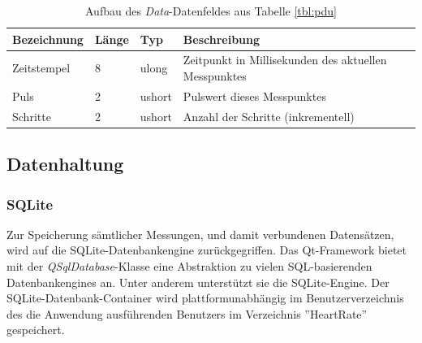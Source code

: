 \begin{table}[h]
	\centering
		\begin{tabularx}{\textwidth}{l|l|l|X}
			\hline
			Bezeichnung & Länge & Typ & Beschreibung \\
			\hline
			\hline
			Zeitstempel & 8 & ulong & Zeitpunkt in Millisekunden des aktuellen Messpunktes\\
			\hline
			Puls & 2 & ushort & Pulswert dieses Messpunktes\\
			\hline
			Schritte & 2 & ushort & Anzahl der Schritte (inkrementell)\\
			\hline
		\end{tabularx}
		\caption{Aufbau des \textit{Data}-Datenfeldes aus Tabelle \ref{tbl:pdu}}
		\label{tbl:datafield-description}
\end{table}

\subsection{Datenhaltung}
\subsubsection{SQLite}
Zur Speicherung sämtlicher Messungen, und damit verbundenen Datensätzen, wird auf die SQLite-Datenbankengine zurückgegriffen. Das Qt-Framework bietet mit der \textit{QSqlDatabase}-Klasse eine Abstraktion zu vielen SQL-basierenden Datenbankengines an\cite{qsqldatabase}. Unter anderem unterstützt sie die SQLite-Engine. Der SQLite-Datenbank-Container wird plattformunabhängig im Benutzerverzeichnis des die Anwendung ausführenden Benutzers im Verzeichnis ''HeartRate'' gespeichert.

